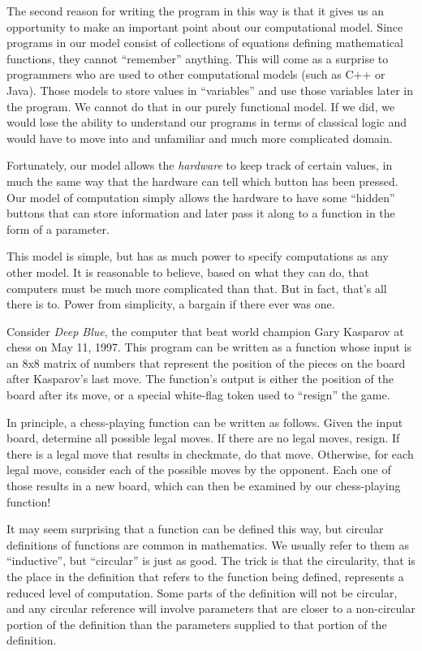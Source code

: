 The second reason for writing the program in this way is that it
gives us an opportunity to make an important point about our
computational model.  Since programs in our model consist of collections of equations defining mathematical functions, they cannot ``remember'' anything.  
This will come as a surprise to programmers who are
used to other computational models (such as C++ or Java).
Those models to store
values in ``variables'' and use those variables later in the program.
We cannot do that in our purely functional model.  If we did, we
would lose the ability to understand our programs in terms of classical
logic and would have to move into and unfamiliar and 
much more complicated domain.

Fortunately, our
model allows the \emph{hardware} to keep track of certain values, in much the
same way that the hardware can tell which button has been pressed. 
Our model of computation simply allows the hardware to have some
``hidden'' buttons that can store information and later pass it along to
a function in the form of a parameter.

This model is simple, but has as much power to specify computations
as any other model. It is reasonable to believe, based on what they
can do, that computers must be much more complicated than that.
But in fact, that's all there is to. 
Power from simplicity, a bargain if there ever was one.

Consider \textit{Deep Blue}, the
computer that beat world champion Gary Kasparov at chess on May 11,
1997.  This program can be written as a function whose input is
an 8x8 matrix of numbers that represent the position of the pieces
on the board after Kasparov's last move.  The function's output is
either the position of the board after its move, or a special
white-flag token used to ``resign'' the game.

In principle, a chess-playing function can be written as follows.
Given the input board, determine all possible legal moves.  If there
are no legal moves, resign.  If there is a legal move that results
in checkmate, do that move.  Otherwise, for each legal move, consider
each of the possible moves by the opponent.  Each one of those results
in a new board, which can then be examined by our chess-playing
function!  

It may seem surprising that a function can be defined this
way, but circular definitions of functions are common in mathematics.
We usually refer to them as ``inductive'', but ``circular'' is just as good.
The trick is that the circularity, that is the place in the definition that
refers to the function being defined, represents a reduced level of computation.
Some parts of the definition will not be circular, and any circular reference
will involve parameters that are closer to a non-circular portion of the
definition than the parameters supplied to that portion of the definition.

